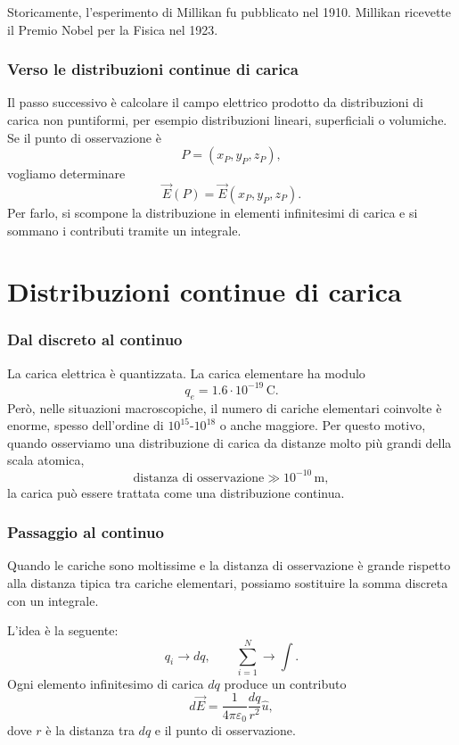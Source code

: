 \documentclass[a4paper]{article}
\begin{document}
Storicamente, l'esperimento di Millikan fu pubblicato nel 1910. Millikan ricevette il Premio Nobel per la Fisica nel 1923.

\section{Verso le distribuzioni continue di carica}

Il passo successivo è calcolare il campo elettrico prodotto da distribuzioni di carica non puntiformi, per esempio distribuzioni lineari, superficiali o volumiche. Se il punto di osservazione è
\[
    P=(x_P,y_P,z_P),
\]
vogliamo determinare
\[
    \vec{E}(P)=\vec{E}(x_P,y_P,z_P).
\]
Per farlo, si scompone la distribuzione in elementi infinitesimi di carica e si sommano i contributi tramite un integrale.

\pagebreak
\part{Distribuzioni continue di carica}

\section{Dal discreto al continuo}

La carica elettrica è quantizzata. La carica elementare ha modulo
\[
    q_e=1.6\cdot 10^{-19}\,\mathrm{C}.
\]
Però, nelle situazioni macroscopiche, il numero di cariche elementari coinvolte è enorme, spesso dell'ordine di \(10^{15}\)-\(10^{18}\) o anche maggiore. Per questo motivo, quando osserviamo una distribuzione di carica da distanze molto più grandi della scala atomica,
\[
    \text{distanza di osservazione}\gg 10^{-10}\,\mathrm{m},
\]
la carica può essere trattata come una distribuzione continua.

\section{Passaggio al continuo}

Quando le cariche sono moltissime e la distanza di osservazione è grande rispetto alla distanza tipica tra cariche elementari, possiamo sostituire la somma discreta con un integrale.

L'idea è la seguente:
\[
    q_i\longrightarrow dq,
    \qquad
    \sum_{i=1}^N\longrightarrow \int.
\]
Ogni elemento infinitesimo di carica \(dq\) produce un contributo
\[
    d\vec{E}=\frac{1}{4\pi\varepsilon_0}\frac{dq}{r^2}\hat{u},
\]
dove \(r\) è la distanza tra \(dq\) e il punto di osservazione.
\end{document}
